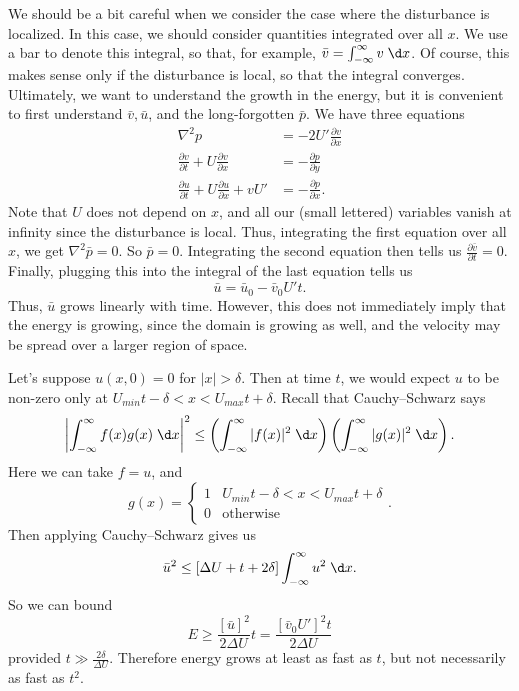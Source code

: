 \documentclass[a4paper]{article}
\begin{document}
We should be a bit careful when we consider the case where the disturbance is localized. In this case, we should consider quantities integrated over all $x$. We use a bar to denote this integral, so that, for example, $\bar{v} = \int_{-\infty}^\infty v\;\d x$. Of course, this makes sense only if the disturbance is local, so that the integral converges. Ultimately, we want to understand the growth in the energy, but it is convenient to first understand $\bar{v}, \bar{u}$, and the long-forgotten $\bar{p}$. We have three equations
\begin{align*}
  \nabla^2 p &= - 2U' \frac{\partial v}{\partial x}\\
  \frac{\partial v}{\partial t} + U \frac{\partial v}{\partial x} &= - \frac{\partial p}{\partial y}\\
  \frac{\partial u}{\partial t} + U \frac{\partial u}{\partial x} + v U' &= - \frac{\partial p}{\partial x}.
\end{align*}
Note that $U$ does not depend on $x$, and all our (small lettered) variables vanish at infinity since the disturbance is local. Thus, integrating the first equation over all $x$, we get $\nabla^2 \bar{p} = 0$. So $\bar{p} = 0$. Integrating the second equation then tells us $\frac{\partial \bar{v}}{\partial t} = 0$. Finally, plugging this into the integral of the last equation tells us
\[
  \bar{u} = \bar{u}_0 - \bar{v}_0 U' t.
\]
Thus, $\bar{u}$ grows linearly with time. However, this does not immediately imply that the energy is growing, since the domain is growing as well, and the velocity may be spread over a larger region of space.

Let's suppose $u(x, 0) = 0$ for $|x| > \delta$. Then at time $t$, we would expect $u$ to be non-zero only at $U_{min} t - \delta < x < U_{max} t + \delta$. Recall that Cauchy--Schwarz says
\[
  \left|\int_{-\infty}^\infty f(x) g(x)\;\d x \right|^2 \leq \left(\int_{-\infty}^\infty |f(x)|^2\;\d x\right)\left(\int_{-\infty}^\infty |g(x)|^2 \;\d x\right).
\]
Here we can take $f = u$, and
\[
  g(x) =
  \begin{cases}
    1 & U_{min} t - \delta < x < U_{max} t + \delta\\
    0 & \text{otherwise}
  \end{cases}.
\]
Then applying Cauchy--Schwarz gives us
\[
  \bar{u}^2 \leq [\Delta U + t + 2\delta] \int_{-\infty}^\infty u^2 \;\d x.
\]
So we can bound
\[
  E \geq \frac{[\bar{u}]^2}{2 \Delta U}t = \frac{[\bar{v}_0 U']^2 t}{2 \Delta U}
\]
provided $t \gg \frac{2\delta}{\Delta U}$. Therefore energy grows at least as fast as $t$, but not necessarily as fast as $t^2$.
\end{document}
